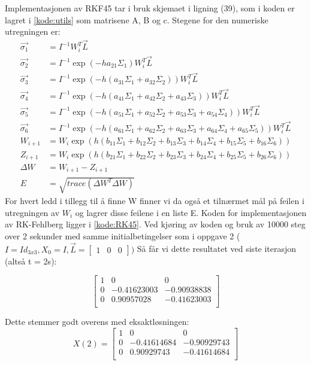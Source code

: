 Implementasjonen av RKF45 tar i bruk skjemaet i ligning (39), som i koden er lagret i \ref{kode:utils} som matrisene A, B og c.\newline 
Stegene for den numeriske utregningen er: \newline
$$
\begin{aligned}
\vec{\sigma_1} &= I^{-1}W_i^T\vec{L} \\
\vec{\sigma_2} &= I^{-1}\exp(-ha_{21}\Sigma_1)W_i^T\vec{L} \\
\vec{\sigma_3} &= I^{-1}\exp(-h(a_{31}\Sigma_1 + a_{32}\Sigma_2))W_i^T\vec{L}  \\
\vec{\sigma_4} &= I^{-1}\exp(-h(a_{41}\Sigma_1 + a_{42}\Sigma_2 + a_{43}\Sigma_3))W_i^T\vec{L}  \\
\vec{\sigma_5} &= I^{-1}\exp(-h(a_{51}\Sigma_1 + a_{52}\Sigma_2 + a_{53}\Sigma_3 + a_{54}\Sigma_4))W_i^T\vec{L} \\
\vec{\sigma_6} &= I^{-1}\exp(-h(a_{61}\Sigma_1 + a_{62}\Sigma_2 + a_{63}\Sigma_3 + a_{64}\Sigma_4 + a_{65}\Sigma_5))W_i^T\vec{L}  \\
W_{i+1} &= W_i\exp(h(b_{11}\Sigma_1 + b_{12}\Sigma_2 + b_{13}\Sigma_3 + b_{14}\Sigma_4 + b_{15}\Sigma_5 + b_{16}\Sigma_6)) \\
Z_{i+1} &= W_i\exp(h(b_{21}\Sigma_1 + b_{22}\Sigma_2 + b_{23}\Sigma_3 + b_{24}\Sigma_4 + b_{25}\Sigma_5 + b_{26}\Sigma_6)) \\
\Delta W &= W_{i+1} - Z_{i+1} \\
E &= \sqrt{trace(\Delta W^T \Delta W)}
\end{aligned}
$$
For hvert ledd i tillegg til å finne W finner vi da også et tilnærmet mål på feilen i utregningen av $W_{i}$ og lagrer disse feilene i en liste E.\newline \newline
Koden for implementasjonen av RK-Fehlberg ligger i \ref{kode:RK45}.\newline
Ved kjøring av koden og bruk av 10000 steg over 2 sekunder med samme initialbetingelser som i oppgave 2 ($I=Id_{3x3}, X_0 = I, \vec{L} = \begin{bmatrix} 1 & 0 & 0\end{bmatrix})$ Så får vi dette resultatet ved siste iterasjon (altså t = 2s):\newline\newline

$$
\begin{bmatrix}
1&0&0\\
0&-0.41623003&-0.90938838\\
0&0.90957028&-0.41623003\\
\end{bmatrix}
$$

Dette stemmer godt overens med eksaktløsningen: \newline
$$
X(2) =     
\begin{bmatrix}
1 & 0 & 0\\
0 & -0.41614684 & -0.90929743\\
0 & 0.90929743 & -0.41614684\\
\end{bmatrix}
$$